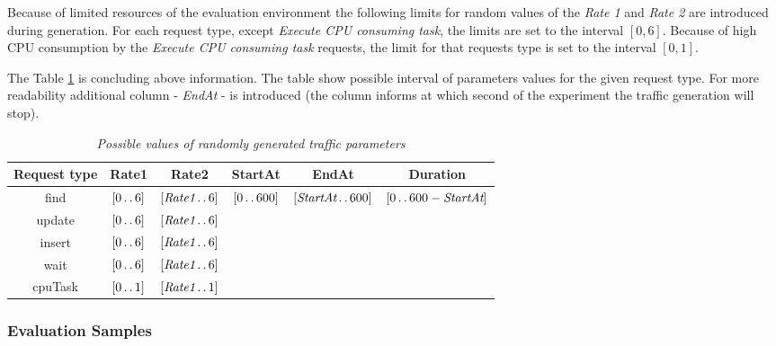 \documentclass[12pt,a4paper]{article}
\begin{document}
Because of limited resources of the evaluation environment the following limits for random values of the \textit{Rate 1} and \textit{Rate 2} are introduced during generation.  For each request type, except \textit{Execute CPU consuming task}, the limits are set to the interval $[0,6]$. Because of high CPU consumption by the \textit{Execute CPU consuming task} requests, the limit for that requests type is set to the interval $[0,1]$. 

The Table \ref{table:random:traffic:possiblevalues} is concluding above information. The table show possible interval of parameters values for the given request type. For more readability additional column - \textit{EndAt} - is introduced (the column informs at which second of the experiment the traffic generation will stop). 

\newcommand{\twodots}{\mathinner {\ldotp \ldotp}}

\begin{table}[ht]

\begin{center}
\begin{tabular}{c|c|c|c|c|c}
\textbf{Request type}& \textbf{Rate1} & \textbf{Rate2} & \textbf{StartAt} & \textbf{EndAt} & \textbf{Duration} \\\hline
find	&$[0 \twodots 6]$    &$[\textit{Rate1} \twodots 6]$    &\multirow{5}{*}{$[0 \twodots 600]$}&\multirow{5}{*}{$[\textit{StartAt} \twodots 600]$}&\multirow{5}{*}{$[0 \twodots 600 -\textit{StartAt}]$}\\ \cline{1-3}
update	&$[0 \twodots 6]$    &$[\textit{Rate1} \twodots 6]$	  &	                     & 	                    \\ \cline{1-3}
insert	&$[0 \twodots 6]$    &$[\textit{Rate1} \twodots 6]$	  &	                     &                      \\ \cline{1-3}
wait	&$[0 \twodots 6]$    &$[\textit{Rate1} \twodots 6]$	  &	                     &                      \\ \cline{1-3}
cpuTask	&$[0 \twodots 1]$     &$[\textit{Rate1} \twodots 1]$     &	                     & 	                   \\  
\end{tabular}
\end{center}
\caption{\textit{Possible values of randomly generated traffic parameters}} \label{table:random:traffic:possiblevalues}
\end{table}


\subsubsection{Evaluation Samples}
\end{document}
